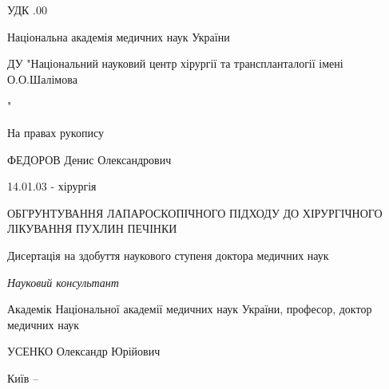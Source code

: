\thispagestyle{empty}

УДК .00

 \begin{centering}
  \linespread{1.1}
  \vspace{2em}

{Національна академія медичних наук України

ДУ "Національний науковий центр хірургії та транспланталогії імені О.О.Шалімова}"

  \vspace{3em}
  
\begin{flushright}
 На правах рукопису
\end{flushright} 

ФЕДОРОВ Денис Олександрович

\vspace{1em}
14.01.03 - хірургія

  \vspace{2em}

\MakeUppercase{Обгрунтування лапароскопічного підходу до хірургічного лікування пухлин печінки}

  \vspace{3em}

\noindent\begin{minipage}{0.5\textwidth}
\centering 
Дисертація на здобуття наукового ступеня доктора медичних наук
\end{minipage}  


  \vspace{5em}
  
\hfill
\noindent\begin{minipage}{0.5\textwidth}
\raggedleft %
\textit{Науковий консультант}

Академік Національної академії медичних наук України, 
професор, доктор медичних наук

УСЕНКО Олександр Юрійович
\end{minipage}  

\vspace{\fill}  %
\begin{minipage}{\textwidth}
    \centering
    Київ -- \the\year
\end{minipage}

  

 \end{centering}

